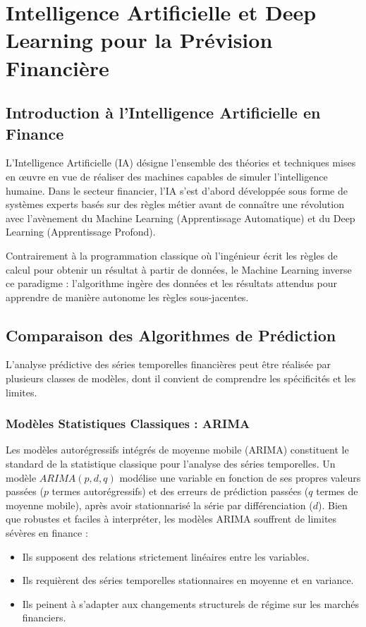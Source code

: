 \chapter{Intelligence Artificielle et Deep Learning pour la Prévision Financière}

\section{Introduction à l'Intelligence Artificielle en Finance}
L'Intelligence Artificielle (IA) désigne l'ensemble des théories et techniques mises en œuvre en vue de réaliser des machines capables de simuler l'intelligence humaine. Dans le secteur financier, l'IA s'est d'abord développée sous forme de systèmes experts basés sur des règles métier avant de connaître une révolution avec l'avènement du Machine Learning (Apprentissage Automatique) et du Deep Learning (Apprentissage Profond).

Contrairement à la programmation classique où l'ingénieur écrit les règles de calcul pour obtenir un résultat à partir de données, le Machine Learning inverse ce paradigme : l'algorithme ingère des données et les résultats attendus pour apprendre de manière autonome les règles sous-jacentes.

\section{Comparaison des Algorithmes de Prédiction}
L'analyse prédictive des séries temporelles financières peut être réalisée par plusieurs classes de modèles, dont il convient de comprendre les spécificités et les limites.

\subsection{Modèles Statistiques Classiques : ARIMA}
Les modèles autorégressifs intégrés de moyenne mobile (ARIMA) constituent le standard de la statistique classique pour l'analyse des séries temporelles. Un modèle $ARIMA(p, d, q)$ modélise une variable en fonction de ses propres valeurs passées ($p$ termes autorégressifs) et des erreurs de prédiction passées ($q$ termes de moyenne mobile), après avoir stationnarisé la série par différenciation ($d$).
Bien que robustes et faciles à interpréter, les modèles ARIMA souffrent de limites sévères en finance :
\begin{itemize}
    \item Ils supposent des relations strictement linéaires entre les variables.
    \item Ils requièrent des séries temporelles stationnaires en moyenne et en variance.
    \item Ils peinent à s'adapter aux changements structurels de régime sur les marchés financiers.
\end{itemize}

